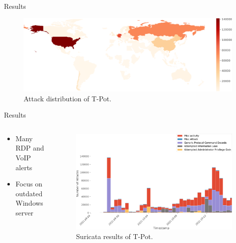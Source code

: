\begin{frame}{Results}
    \begin{figure}
        \centering
        \includegraphics[width=\columnwidth]{img/tpot-overview-map.pdf}
        \caption[Attack distribution of T-Pot]{
            Attack distribution of T-Pot.
        }
        \label{fig:attack-distribution}
    \end{figure}
\end{frame}

\begin{frame}{Results}
    \begin{columns}
        \begin{column}{0.4\textwidth}
            {\footnotesize
            \begin{itemize}
                \item Many RDP and VoIP alerts
                \item Focus on outdated Windows server
            \end{itemize}
            }
        \end{column}
        \begin{column}{0.6\textwidth}
            \begin{figure}
                \centering
                \includegraphics[width=\columnwidth]{img/tpot-suricata-alerts.pdf}
                \caption[Suricata results of T-Pot]{
                    Suricata results of T-Pot.
                }
                \label{fig:suricata-results}
            \end{figure}
        \end{column}
    \end{columns}
\end{frame}

